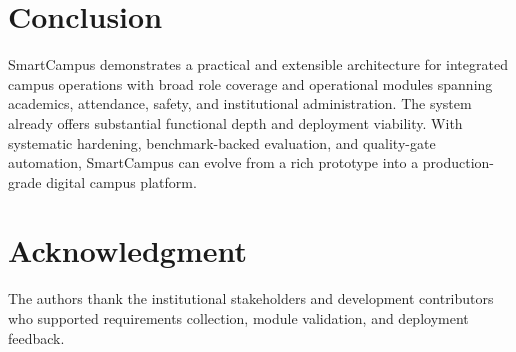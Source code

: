 \documentclass[conference]{IEEEtran}
\begin{document}
\section{Conclusion}
SmartCampus demonstrates a practical and extensible architecture for integrated campus operations with broad role coverage and operational modules spanning academics, attendance, safety, and institutional administration. The system already offers substantial functional depth and deployment viability. With systematic hardening, benchmark-backed evaluation, and quality-gate automation, SmartCampus can evolve from a rich prototype into a production-grade digital campus platform.

\section*{Acknowledgment}
The authors thank the institutional stakeholders and development contributors who supported requirements collection, module validation, and deployment feedback.



\end{document}
